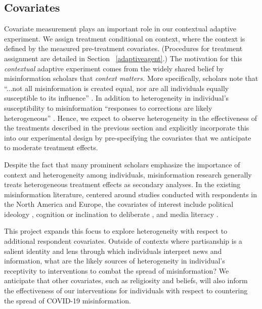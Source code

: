 \documentclass[letterpaper, 12pt, parskip=full,]{scrartcl}
\begin{document}
\subsection{Covariates}

Covariate measurement plays an important role in our contextual adaptive experiment. We assign treatment conditional on context, where the context is defined by the measured pre-treatment covariates. (Procedures for treatment assignment are detailed in Section ~\ref{adaptiveagent}.)
The motivation for this \textit{contextual} adaptive experiment comes from the widely shared belief by misinformation scholars that \textit{context matters.} More specifically, scholars note that ``...not all misinformation is created equal, nor are all individuals equally susceptible to its influence'' \citep{wittenberg2020misinformation}. In addition to heterogeneity in individual's susceptibility to misinformation ``responses to corrections are likely heterogeneous'' \citep{swire2020searching}. Hence, we expect to observe heterogeneity in the effectiveness of the treatments described in the previous section and explicitly incorporate this into our experimental design by pre-specifying the covariates that we anticipate to moderate treatment effects.

Despite the fact that many prominent scholars emphasize the importance of context and heterogeneity among individuals, misinformation research generally treats heterogeneous treatment effects as secondary analyses. In the existing misinformation literature, centered around studies conducted with respondents in the North America and Europe, the covariates of interest include political ideology \citep{pennycook_epstein_mosleh_arechar_eckles_rand_2019}, cognition or inclination to deliberate \citep{bago2020fake}, and media literacy \citep{guess2020digital}.  

This project expands this focus to explore heterogeneity with respect to additional respondent covariates. Outside of contexts where partisanship is a salient identity and lens through which individuals interpret news and information, what are the likely sources of heterogeneity in individual's receptivity to interventions to combat the spread of misinformation? We anticipate that other covariates, such as religiosity and beliefs, will also inform the effectiveness of our interventions for individuals with respect to countering the spread of COVID-19 misinformation. 
\end{document}
